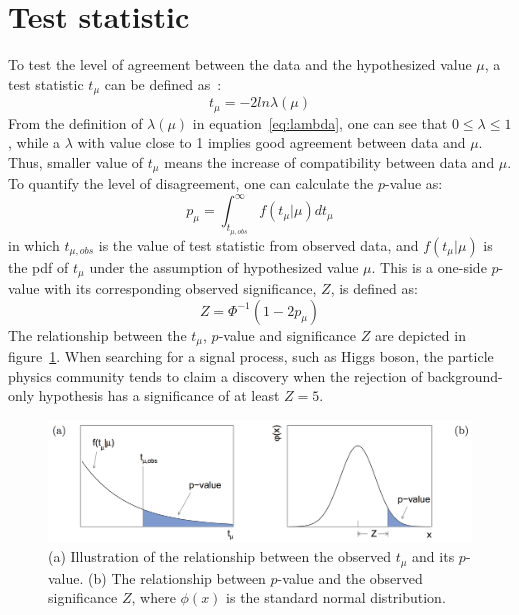 \section{Test statistic}
\label{sec:teststat}

To test the level of agreement between the data and the hypothesized value $\mu$, a test statistic $t_{\mu}$ can be defined as~\cite{Cowan:2010js}:
\begin{equation}
    t_{\mu} = -2 ln \lambda (\mu)
\end{equation}
From the definition of $\lambda(\mu)$ in equation~\ref{eq:lambda}, one can see that $0 \le \lambda \le 1$,
while a $\lambda$ with value close to 1 implies good agreement between data and $\mu$.
Thus, smaller value of $t_{\mu}$ means the increase of compatibility between data and $\mu$.
To quantify the level of disagreement, one can calculate the $p$-value as:
\begin{equation}
    p_{\mu} = \int_{t_{\mu, obs}}^{\infty} f(t_{\mu}|\mu) d t_{\mu}
\end{equation}
in which $t_{\mu, obs}$ is the value of test statistic from observed data, 
and $f(t_{\mu}|\mu)$ is the pdf of $t_{\mu}$ under the assumption of hypothesized value $\mu$.
This is a one-side $p$-value with its corresponding observed significance, $Z$, is defined as:
\begin{equation}
    Z = \Phi^{-1}(1-2p_{\mu})
\end{equation}
The relationship between the $t_{\mu}$, $p$-value and significance $Z$ are depicted in figure~\ref{fig:pvalue_Z}.
When searching for a signal process, such as Higgs boson, the particle physics community tends to claim a discovery
when the rejection of background-only hypothesis has a significance of at least $Z = 5$.

\begin{figure}[!htbp]
\begin{center}
\includegraphics[width=1.0\textwidth]{figures/Statistic/test_statistic_pvalue_Z.png}
\end{center}
\caption{(a) Illustration of the relationship between the observed $t_{\mu}$ and its $p$-value. 
         (b) The relationship between $p$-value and the observed significance $Z$, where $\phi(x)$ is the standard normal distribution.
        }
\label{fig:pvalue_Z}
\end{figure}

